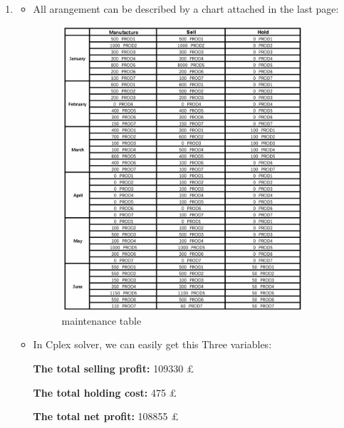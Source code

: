 \documentclass[12pt,a4paper]{article}
\makeatletter
\newtheorem*{solution}{Solution}
\theoremstyle{definition}
\renewenvironment{solution}[1][Solution] {\par\pushQED{\qed}\normalfont\topsep6\p@\@plus6\p@\relax\trivlist\item[\hskip\labelsep\bfseries#1\@addpunct{.}]\ignorespaces}{\popQED\endtrivlist\@endpefalse} \makeatother
\makeatother
\begin{document}
\begin{enumerate}
\begin{solution}
\begin{itemize}
\begin{itemize}
            \item All arangement can be described by a chart attached in the last page:
                \begin{figure}[htbp]
                \centering
                \includegraphics[width=0.9\textwidth]{figures/1_2.png}
                \caption{maintenance table}\label{PNG3}
                \end{figure}
            \item In Cplex solver, we can easily get this Three variables:\par
            \textbf{The total selling profit:} 109330 \pounds\par
            \textbf{The total holding cost:} 475 \pounds\par
            \textbf{The total net profit:} 108855 \pounds\par
          \end{itemize}
        \end{itemize}
    \end{solution}

\end{enumerate}

\vspace{20pt}


\end{document}
